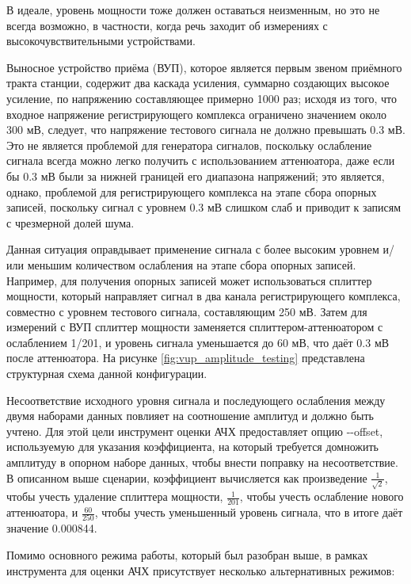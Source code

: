 \documentclass{report}
\begin{document}
В идеале, уровень мощности тоже должен оставаться неизменным, но это не всегда возможно, в частности, когда речь заходит об измерениях с высокочувствительными устройствами.

Выносное устройство приёма (ВУП), которое является первым звеном приёмного тракта станции, содержит два каскада усиления, суммарно создающих высокое усиление, по напряжению составляющее примерно 1000 раз; исходя из того, что входное напряжение регистрирующего комплекса ограничено значением около 300 мВ, следует, что напряжение тестового сигнала не должно превышать 0.3 мВ. Это не является проблемой для генератора сигналов, поскольку ослабление сигнала всегда можно легко получить с использованием аттенюатора, даже если бы 0.3 мВ были за нижней границей его диапазона напряжений; это является, однако, проблемой для регистрирующего комплекса на этапе сбора опорных записей, поскольку сигнал с уровнем 0.3 мВ слишком слаб и приводит к записям с чрезмерной долей шума.

Данная ситуация оправдывает применение сигнала с более высоким уровнем и/или меньшим количеством ослабления на этапе сбора опорных записей. Например, для получения опорных записей может использоваться сплиттер мощности, который направляет сигнал в два канала регистрирующего комплекса, совместно с уровнем тестового сигнала, составляющим 250 мВ. Затем для измерений с ВУП сплиттер мощности заменяется сплиттером-аттенюатором с ослаблением 1/201, и уровень сигнала уменьшается до 60 мВ, что даёт 0.3 мВ после аттенюатора. На рисунке \ref{fig:vup_amplitude_testing} представлена структурная схема данной конфигурации.


Несоответствие исходного уровня сигнала и последующего ослабления между двумя наборами данных повлияет на соотношение амплитуд и должно быть учтено. Для этой цели инструмент оценки АЧХ предоставляет опцию -{}-offset, используемую для указания коэффициента, на который требуется домножить амплитуду в опорном наборе данных, чтобы внести поправку на несоответствие. В описанном выше сценарии, коэффициент вычисляется как произведение $\frac{1}{\sqrt{2}}$, чтобы учесть удаление сплиттера мощности, $\frac{1}{201}$, чтобы учесть ослабление нового аттенюатора, и $\frac{60}{250}$, чтобы учесть уменьшенный уровень сигнала, что в итоге даёт значение 0.000844.

Помимо основного режима работы, который был разобран выше, в рамках инструмента для оценки АЧХ присутствует несколько альтернативных режимов:
\end{document}

